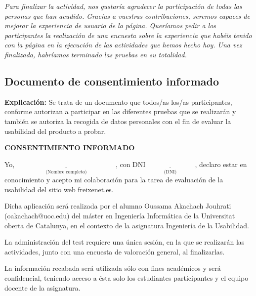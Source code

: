 \documentclass[spanish]{article}
\begin{document}
\textit{Para finalizar la actividad, nos gustaría agradecer la
participación de todas las personas que han acudido. Gracias
a vuestras contribuciones, seremos capaces de mejorar la
experiencia de usuario de la página. Queríamos pedir a los
participantes la realización de una encuesta sobre la
experiencia que habéis tenido con la página en la ejecución
de las actividades que hemos hecho hoy. Una vez finalizada,
habríamos terminado las pruebas en su totalidad.}\newline

\newpage

\subsection{Documento de consentimiento informado}

\textbf{Explicación:} Se trata de un documento que todos/as los/as
participantes, conforme autorizan a participar en las
diferentes pruebas que se realizarán y también se autoriza
la recogida de datos personales con el fin de evaluar la
usabilidad del producto a probar.

\hspace{2cm}

\begin{center}
\textbf{CONSENTIMIENTO INFORMADO}
\end{center}

Yo, $\underset{\text{(Nombre
completo)}}{\underline{\hspace{6cm}}}$, con
DNI$\underset{\text{(DNI)}}{\underline{\hspace{3cm}}}$,
declaro estar en
conocimiento y acepto mi
colaboración para la tarea de evaluación de la usabilidad
del sitio web freixenet.es.\newline

Dicha aplicación será realizada por el alumno Oussama
Akachach Jouhrati (oakachach@uoc.edu) del máster en
Ingeniería Informática de la Universitat oberta de
Catalunya, en el contexto de la asignatura Ingeniería de la
Usabilidad.\newline

La administración del test requiere una única sesión, en la
que se realizarán las actividades, junto con una encuesta de
valoración general, al finalizarlas.\newline

La información recabada será utilizada sólo con fines
académicos y será confidencial, teniendo acceso a ésta solo
los estudiantes participantes y el equipo docente de la
asignatura.\newline
\end{document}
